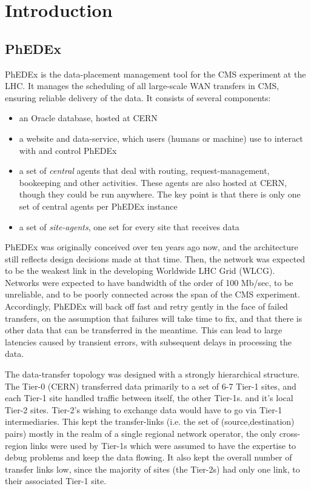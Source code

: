 \section{Introduction}
\subsection{PhEDEx}

PhEDEx\cite{PhEDEx} is the data-placement management tool for the CMS\cite{CMS} 
experiment at the LHC. It manages the scheduling of all large-scale WAN transfers 
in CMS, ensuring reliable delivery of the data. It consists of several components:

\begin{itemize}
	\item an Oracle database, hosted at CERN
	\item a website and data-service, which users (humans or machine) use to 
	interact with and control PhEDEx
	\item a set of \emph{central} agents that deal with routing, request-management,
	bookeeping and other activities. These agents are also hosted at CERN, though 
	they could be run anywhere. The key point is that there is only one set of 
	central agents per PhEDEx instance
	\item a set of \emph{site-agents}, one set for every site that receives data
\end{itemize}

PhEDEx was originally conceived over ten years ago now, and the architecture still 
reflects design decisions made at that time. Then, the network was expected to be 
the weakest link in the developing Worldwide LHC Grid (WLCG)\cite{WLCG}. Networks 
were expected to have bandwidth of the order of 100 Mb/sec, to be unreliable, and 
to be poorly connected across the span of the CMS experiment. Accordingly, PhEDEx 
will back off fast and retry gently in the face of failed transfers, on the assumption 
that failures will take time to fix, and that there is other data that can be 
transferred in the meantime. This can lead to large latencies caused by transient 
errors, with subsequent delays in processing the data.

The data-transfer topology was designed with a strongly hierarchical structure. 
The Tier-0 (CERN) transferred data primarily to a set of 6-7 Tier-1 sites, and each
 Tier-1 site handled traffic between itself, the other Tier-1s. and it's local Tier-2
 sites. Tier-2's wishing to exchange data would have to go via Tier-1 intermediaries. 
 This kept the transfer-links (i.e. the set of (source,destination) pairs) mostly in 
 the realm of a single regional network operator, the only cross-region links were 
 used by Tier-1s which were assumed to have the expertise to debug problems and keep 
 the data flowing. It also kept the overall number of transfer links low, since the 
 majority of sites (the Tier-2s) had only one link, to their associated Tier-1 site.
 
